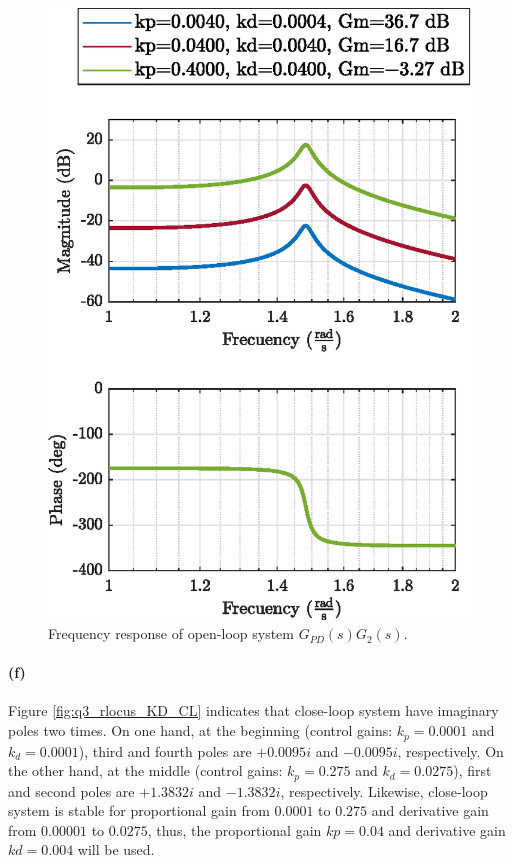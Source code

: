 \begin{figure}[h!]
	\centering
	\includegraphics{images/question3/q3_bode_KD_OL.eps}
	\caption{Frequency response of open-loop system $G_{PD}(s) G_2(s)$.}
	\label{fig:q3_bode_KD_OL}
\end{figure}

\newpage
\paragraph{(f)}  Figure \ref{fig:q3_rlocus_KD_CL} indicates that close-loop system have imaginary poles two times. On one hand, at the beginning (control gains: $k_p=0.0001$ and $k_d=0.0001$), third and fourth poles are $+0.0095i$ and $-0.0095i$, respectively. On the other hand, at the middle  (control gains: $k_p=0.275$ and $k_d=0.0275$), first and second poles are $+1.3832i$ and $-1.3832i$, respectively. Likewise,  close-loop system is stable for proportional gain from $0.0001$ to $0.275$ and derivative gain from $0.00001$ to $0.0275$, thus, the proportional gain $kp=0.04$ and derivative gain $kd=0.004$ will be used. 

